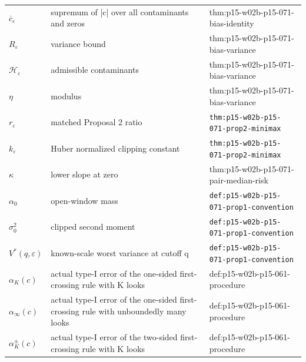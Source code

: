 \begin{longtable}{@{}p{}p{}p{}@{}}
\(\overline c_\varepsilon\) & supremum of |c| over all contaminants and zeros & thm:\allowbreak{}p15-\allowbreak{}w02b-\allowbreak{}p15-\allowbreak{}071-\allowbreak{}bias-\allowbreak{}identity \\
\(R_\varepsilon\) & variance bound & thm:\allowbreak{}p15-\allowbreak{}w02b-\allowbreak{}p15-\allowbreak{}071-\allowbreak{}bias-\allowbreak{}variance \\
\(\mathcal H_\varepsilon\) & admissible contaminants & thm:\allowbreak{}p15-\allowbreak{}w02b-\allowbreak{}p15-\allowbreak{}071-\allowbreak{}bias-\allowbreak{}variance \\
\(\eta\) & modulus & thm:\allowbreak{}p15-\allowbreak{}w02b-\allowbreak{}p15-\allowbreak{}071-\allowbreak{}bias-\allowbreak{}variance \\
\(r_\varepsilon\) & matched Proposal 2 ratio & \texttt{thm:\allowbreak{}p15-\allowbreak{}w02b-\allowbreak{}p15-\allowbreak{}071-\allowbreak{}prop2-\allowbreak{}minimax} \\
\(k_\varepsilon\) & Huber normalized clipping constant & \texttt{thm:\allowbreak{}p15-\allowbreak{}w02b-\allowbreak{}p15-\allowbreak{}071-\allowbreak{}prop2-\allowbreak{}minimax} \\
\(\kappa\) & lower slope at zero & thm:\allowbreak{}p15-\allowbreak{}w02b-\allowbreak{}p15-\allowbreak{}071-\allowbreak{}pair-\allowbreak{}median-\allowbreak{}risk \\
\(\alpha_0\) & open-window mass & \texttt{def:\allowbreak{}p15-\allowbreak{}w02b-\allowbreak{}p15-\allowbreak{}071-\allowbreak{}prop1-\allowbreak{}convention} \\
\(\sigma_0^2\) & clipped second moment & \texttt{def:\allowbreak{}p15-\allowbreak{}w02b-\allowbreak{}p15-\allowbreak{}071-\allowbreak{}prop1-\allowbreak{}convention} \\
\(V^*(q,\allowbreak \varepsilon)\) & known-scale worst variance at cutoff q & \texttt{def:\allowbreak{}p15-\allowbreak{}w02b-\allowbreak{}p15-\allowbreak{}071-\allowbreak{}prop1-\allowbreak{}convention} \\
\(\alpha_K(c)\) & actual type-I error of the one-sided first-crossing rule with K looks & def:\allowbreak{}p15-\allowbreak{}w02b-\allowbreak{}p15-\allowbreak{}061-\allowbreak{}procedure \\
\(\alpha_\infty(c)\) & actual type-I error of the one-sided first-crossing rule with unboundedly many looks & def:\allowbreak{}p15-\allowbreak{}w02b-\allowbreak{}p15-\allowbreak{}061-\allowbreak{}procedure \\
\(\alpha^{\pm}_K(c)\) & actual type-I error of the two-sided first-crossing rule with K looks & def:\allowbreak{}p15-\allowbreak{}w02b-\allowbreak{}p15-\allowbreak{}061-\allowbreak{}procedure \\

\end{longtable}
